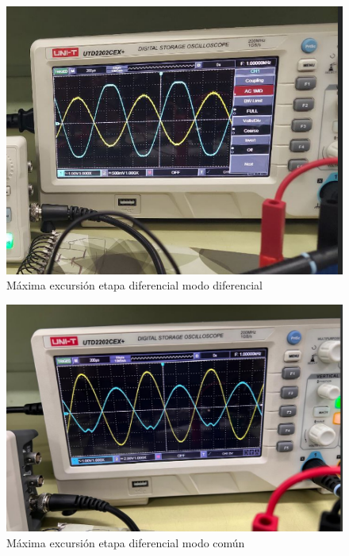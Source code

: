 \begin{figure}[ht]
    \centering
    \includegraphics[width=1.0\textwidth]{src/images/resultados/p2/med-maxima-excursion-mod-diff.png}
    \caption{Máxima excursión etapa diferencial modo diferencial}
    \label{fig:max-excursion-mod-diff}
\end{figure}

\begin{figure}[ht]
    \centering
    \includegraphics[width=1.0\textwidth]{src/images/resultados/p2/med-maxima-excursion-mod-comun.png}
    \caption{Máxima excursión etapa diferencial modo común}
    \label{fig:max-excursion-mod-comun}
\end{figure}
